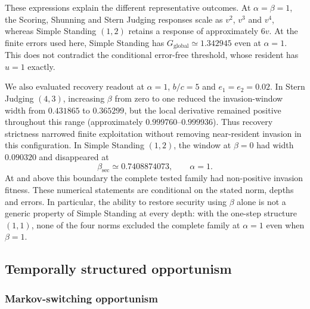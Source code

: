 \documentclass[fleqn,10pt]{wlscirep}
\begin{document}
These expressions explain the different representative outcomes. At $\alpha=\beta=1$, the Scoring, Shunning and Stern Judging responses scale as $v^2$, $v^3$ and $v^4$, whereas Simple Standing $(1,2)$ retains a response of approximately $6v$. At the finite errors used here, Simple Standing has $G_{\mathrm{global}}\simeq1.342945$ even at $\alpha=1$. This does not contradict the conditional error-free threshold, whose resident has $u=1$ exactly.

We also evaluated recovery readout at $\alpha=1$, $b/c=5$ and $e_1=e_2=0.02$. In Stern Judging $(4,3)$, increasing $\beta$ from zero to one reduced the invasion-window width from $0.431865$ to $0.365299$, but the local derivative remained positive throughout this range (approximately $0.999760$--$0.999936$). Thus recovery strictness narrowed finite exploitation without removing near-resident invasion in this configuration. In Simple Standing $(1,2)$, the window at $\beta=0$ had width $0.090320$ and disappeared at
\begin{equation}
\beta_{\mathrm{sec}}\simeq0.7408874073,\qquad\alpha=1.
\label{eq:si-readout-beta-sec}
\end{equation}
At and above this boundary the complete tested family had non-positive invasion fitness. These numerical statements are conditional on the stated norm, depths and errors. In particular, the ability to restore security using $\beta$ alone is not a generic property of Simple Standing at every depth: with the one-step structure $(1,1)$, none of the four norms excluded the complete family at $\alpha=1$ even when $\beta=1$.

\subsection{Temporally structured opportunism}
\label{sec:si-temporal-opportunism}

\subsubsection{Markov-switching opportunism}
\end{document}
